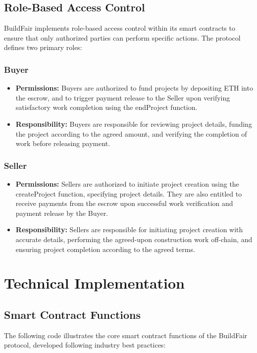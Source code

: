 \documentclass[12pt]{article}
\begin{document}
\subsection{Role-Based Access Control}
BuildFair implements role-based access control within its smart contracts to ensure that only authorized parties can perform specific actions. The protocol defines two primary roles:

\subsubsection{Buyer}
\begin{itemize}
    \item \textbf{Permissions:} Buyers are authorized to fund projects by depositing ETH into the escrow, and to trigger payment release to the Seller upon verifying satisfactory work completion using the endProject function.
    \item \textbf{Responsibility:} Buyers are responsible for reviewing project details, funding the project according to the agreed amount, and verifying the completion of work before releasing payment.
\end{itemize}

\subsubsection{Seller}
\begin{itemize}
    \item \textbf{Permissions:} Sellers are authorized to initiate project creation using the createProject function, specifying project details. They are also entitled to receive payments from the escrow upon successful work verification and payment release by the Buyer.
    \item \textbf{Responsibility:} Sellers are responsible for initiating project creation with accurate details, performing the agreed-upon construction work off-chain, and ensuring project completion according to the agreed terms.
\end{itemize}

\section{Technical Implementation}
\subsection{Smart Contract Functions}
The following code illustrates the core smart contract functions of the BuildFair protocol, developed following industry best practices\cite{smart_contract_best}:
\end{document}
